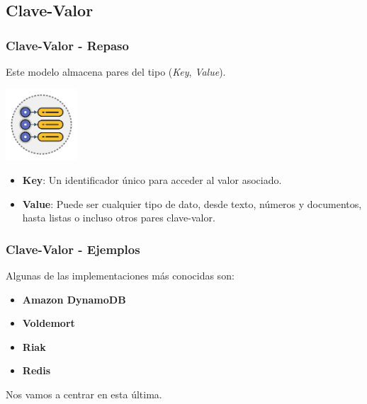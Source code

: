 \subsection{Clave-Valor}

\begin{frame}
    \frametitle{Clave-Valor - Repaso}

    Este modelo almacena pares del tipo (\textit{Key}, \textit{Value}).
    
    \begin{center}
    \includegraphics[width=0.2\textwidth]{images/KeyValue.png}
    \end{center}

     
    
     \begin{itemize}
        \item \textbf{Key}: Un identificador único para acceder al valor asociado.

         
        
         \item \textbf{Value}: Puede ser cualquier tipo de dato, desde texto, números y documentos, hasta listas o incluso otros pares clave-valor.
     \end{itemize}

\end{frame}

\begin{frame}
    \frametitle{Clave-Valor - Ejemplos}
    
    Algunas de las implementaciones más conocidas son:

     
    
     \begin{itemize}
        \item \textbf{Amazon DynamoDB}
                        
        \item \textbf{Voldemort}

        \item \textbf{Riak}
        
        \item \textbf{Redis}
     
     \end{itemize}

     

     Nos vamos a centrar en esta última.
\end{frame}

